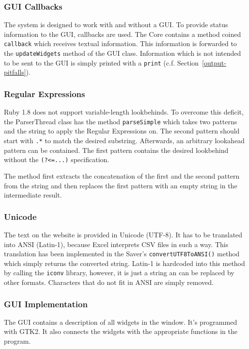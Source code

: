 \documentclass{scrartcl}
\begin{document}
\subsubsection{GUI Callbacks}
The system is designed to work with and without a GUI. To provide status information to the GUI, callbacks are used. The Core contains a method coined \texttt{callback} which receives textual information. This information is forwarded to the \texttt{updateWidgets} method of the GUI class. Information which is not intended to be sent to the GUI is simply printed with a \texttt{print} (c.f. Section~\ref{output-pitfalls}).

\subsubsection{Regular Expressions}
Ruby 1.8 does not support variable-length lookbehinds. To overcome this deficit, the ParserThread class has the method \texttt{parseSimple} which takes two patterns and the string to apply the Regular Expressions on. The second pattern should start with \texttt{.*} to match the desired substring. Afterwards, an arbitrary lookahead pattern can be contained. The first pattern contains the desired lookbehind without the \texttt{(?<=...)} specification.

The method first extracts the concatenation of the first and the second pattern from the string and then replaces the first pattern with an empty string in the intermediate result. 

\subsubsection{Unicode}
The text on the website is provided in Unicode (UTF-8). It has to be translated into ANSI (Latin-1), because Excel interprets CSV files in such a way. This translation has been implemented in the Saver's \texttt{convertUTF8ToANSI()} method which simply returns the converted string. Latin-1 is hardcoded into this method by calling the \texttt{iconv} library, however, it is just a string an can be replaced by other formats. Characters that do not fit in ANSI are simply removed.

\subsubsection{GUI Implementation}
The GUI contains a description of all widgets in the window. It's programmed with GTK2. It also connects the widgets with the appropriate functions in the program.
\end{document}

